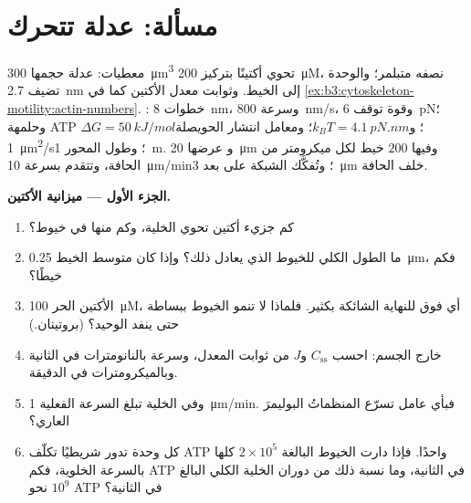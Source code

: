\section{مسألة: عدلة تتحرك}

\begin{problem}
\label{pb:b3:cytoskeleton-motility:1}
معطيات: عدلة حجمها \qty{300}{\micro m^3} تحوي أكتينًا بتركيز
\qty{200}{\micro M}، نصفه متبلمر؛ والوحدة تضيف \qty{2.7}{nm} إلى
الخيط. وثوابت معدل الأكتين كما في
\cref{ex:b3:cytoskeleton-motility:actin-numbers}. : خطوات \qty{8}{nm}،
وسرعة \qty{800}{nm/s}، وقوة توقف \qty{6}{pN}؛ وحلمهة ATP
$\Delta G = \qty{50}{kJ/mol}$؛ و$k_{B}T = \qty{4.1}{pN.nm}$؛ ومعامل
انتشار الحويصلة \qty{1}{\micro m^2/s}؛ وطول المحور \qty{1}{m}. و
 عرضها \qty{20}{\micro m} وفيها $200$ خيط لكل
ميكرومتر من الحافة، وتتقدم بسرعة \qty{10}{\micro m/min}؛ وتُفكَّك الشبكة
على بعد \qty{3}{\micro m} خلف الحافة.

\medskip
\noindent\textbf{الجزء الأول --- ميزانية الأكتين.}
\begin{enumerate}
  \item كم جزيء أكتين تحوي الخلية، وكم منها
        في خيوط؟
  \item ما الطول الكلي للخيوط الذي يعادل ذلك؟ وإذا كان متوسط الخيط
        \qty{0.25}{\micro m}، فكم خيطًا؟
  \item الأكتين الحر \qty{100}{\micro M}، أي فوق 
        للنهاية الشائكة بكثير. فلماذا لا تنمو الخيوط ببساطة
        حتى ينفد الوحيد؟ (بروتينان.)
  \item {} خارج الجسم: احسب $C_{\text{ss}}$ و$J$ من
        ثوابت المعدل، وسرعة  بالنانومترات في
        الثانية وبالميكرومترات في الدقيقة.
  \item وفي الخلية تبلغ السرعة الفعلية \qty{1}{\micro m/min}. فبأي
        عامل تسرّع المنظماتُ البوليمرَ العاري؟
  \item كل وحدة تدور شريطيًا تكلّف ATP واحدًا. فإذا دارت الخيوط البالغة $2\times 10^{5}$
        كلها بالسرعة الخلوية، فكم ATP في
        الثانية، وما نسبة ذلك من دوران الخلية الكلي البالغ
        نحو $10^{9}$ ATP في الثانية؟
\end{enumerate}


\end{problem}
